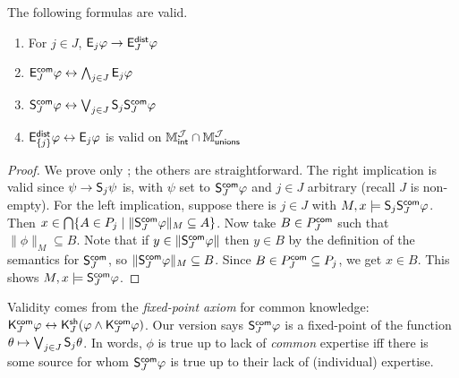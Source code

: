\begin{proposition}
\label{exp_prop_collective_validities}
The following formulas are valid.

\begin{enumerate}
    \item For $j \in J$, $\mathsf{E}_j\varphi \to \mathsf{E}_J^{\mathsf{dist}}\varphi$

    \item $\mathsf{E}_J^{\mathsf{com}}\varphi \leftrightarrow \bigwedge_{j \in J}{\mathsf{E}_j\varphi}$

    \item\label{exp_item_common_exp_fp} $\mathsf{S}_J^{\mathsf{com}}\varphi \leftrightarrow \bigvee_{j \in
        J}\mathsf{S}_j\mathsf{S}_J^{\mathsf{com}}\varphi$

    \item $\mathsf{E}_{\{j\}}^{\mathsf{dist}}\varphi \leftrightarrow \mathsf{E}_j\varphi$ is valid on $\mathbb{M}_{\mathsf{int}}^{\mathcal{J}} \cap
          \mathbb{M}_{\mathsf{unions}}^{\mathcal{J}}$

    \end{enumerate}
\end{proposition}
\begin{proof}
    We prove only ; the others are straightforward.
    The right implication is valid since $\psi \to \mathsf{S}_j\psi$ is, with
    $\psi$ set to $\mathsf{S}_J^{\mathsf{com}}\varphi$ and $j \in J$ arbitrary (recall $J$ is
    non-empty).
    For the left implication, suppose there is $j \in J$ with $M, x \models
    \mathsf{S}_j\mathsf{S}_J^{\mathsf{com}}\varphi$. Then $x \in \bigcap\{A \in P_j \mid
    \|\mathsf{S}_J^{\mathsf{com}}\varphi\|_M \subseteq A\}$. Now take $B \in P_J^{\mathsf{com}}$ such
    that $\|\phi\|_M \subseteq B$. Note that if $y \in \|\mathsf{S}_J^{\mathsf{com}}\varphi\|$
    then $y \in B$ by the definition of the semantics for $\mathsf{S}_J^{\mathsf{com}}$, so
    $\|\mathsf{S}_J^{\mathsf{com}}\varphi\|_M \subseteq B$. Since $B \in P_J^{\mathsf{com}} \subseteq
    P_j$, we get $x \in B$.  This shows $M, x \models \mathsf{S}_J^{\mathsf{com}}\varphi$.
\end{proof}

Validity  comes from the
\emph{fixed-point axiom} for common knowledge: $\mathsf{K}^{\mathsf{com}}_J\varphi \leftrightarrow
\mathsf{K}^{\mathsf{sh}}_J(\varphi \land \mathsf{K}^{\mathsf{com}}_J\varphi)$. Our version says
$\mathsf{S}_J^{\mathsf{com}}\varphi$ is a fixed-point of the function $\theta \mapsto \bigvee_{j
\in J}{\mathsf{S}_j\theta}$. In words, $\phi$ is true up to lack of \emph{common}
expertise iff there is some source for whom $\mathsf{S}_J^{\mathsf{com}}\varphi$ is true up to
their lack of (individual) expertise.

